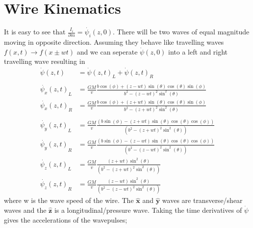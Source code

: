 \documentclass{report}
\begin{document}
\section*{Wire Kinematics}
It is easy to see that  $\frac{I_i}{\partial m} = \dot{\psi_i} (z, 0)$. There will be two waves of equal magnitude moving in opposite direction. Assuming they behave like travelling waves $f(x, t) \rightarrow f(x \pm w t)$ and we can seperate $\dot\psi(z,0)$ into a left and right travelling wave resulting in
\begin{align}
    \dot{\psi} (z, t) &= {\dot{\psi} (z, t)}_L + {\dot{\psi} (z, t)}_R\\
    \nonumber\\
    \nonumber {\dot{\psi_x} (z, t)}_L &= \frac{G M}{v} \frac{b \cos (\phi )+ (z - w t) \sin (\theta ) \cos (\theta ) \sin (\phi )}{b^2-{(z - w t)}^2 \sin ^2(\theta )}\\
    \nonumber {\dot{\psi_x} (z, t)}_R &= \frac{G M}{v} \frac{b \cos (\phi )+ (z + w t) \sin (\theta ) \cos (\theta ) \sin (\phi )}{b^2-{(z + w t)}^2 \sin ^2(\theta )}\\
    \nonumber\\
    \nonumber {\dot{\psi_y} (z, t)}_L &= \frac{G M}{v} \frac{(b \sin (\phi )-{(z + w t)} \sin (\theta ) \cos (\theta ) \cos (\phi ))}{\left(b^2-{(z + w t)}^2 \sin ^2(\theta )\right)}\\
    \nonumber {\dot{\psi_y} (z, t)}_R &= \frac{G M}{v} \frac{(b \sin (\phi )-{(z - w t)} \sin (\theta ) \cos (\theta ) \cos (\phi ))}{\left(b^2-{(z - w t)}^2 \sin ^2(\theta )\right)}
    \nonumber\\
    \nonumber {\dot{\psi_z} (z, t)}_L &= \frac{G M}{v} \frac{{(z + w t)} \sin ^2(\theta )}{\left(b^2-{(z + w t)}^2 \sin ^2(\theta )\right)}\\
    \nonumber {\dot{\psi_z} (z, t)}_R &= \frac{G M}{v} \frac{{(z - w t)} \sin ^2(\theta )}{\left(b^2-{(z - w t)}^2 \sin ^2(\theta )\right)}
\end{align}
where w is the wave speed of the wire. The $\mathbf{\hat x}$ and $\mathbf{\hat y}$ waves are transverse/shear waves and the $\mathbf{\hat z}$ is a longitudinal/pressure wave.
Taking the time derivatives of $\dot{\psi}$ gives the accelerations of the wavepulses;
\end{document}
